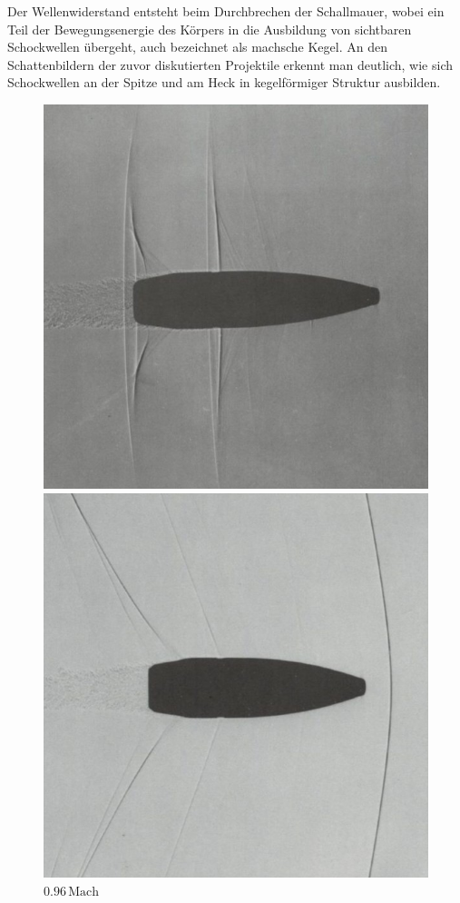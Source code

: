 Der Wellenwiderstand entsteht beim Durchbrechen 
der Schallmauer, wobei ein Teil der Bewegungsenergie 
des Körpers in die Ausbildung von sichtbaren Schockwellen übergeht,
auch bezeichnet als machsche Kegel.
An den Schattenbildern der zuvor diskutierten Projektile 
erkennt man deutlich,
wie sich Schockwellen an der Spitze und am Heck 
in kegelförmiger Struktur ausbilden.
\begin{figure}
    \centering
    \begin{minipage}[b]{0.32\textwidth}
        \centering
        \includegraphics[width=\linewidth]{papers/ueberschall/figures/0.96_mach_projektil.jpg}
        \caption*{$0.96\,\mathrm{Mach}$}
    \end{minipage}
    \hfill
    \begin{minipage}[b]{0.32\textwidth}
        \centering
        \includegraphics[width=\linewidth]{papers/ueberschall/figures/1.06_mach_projektil.jpg}

\end{minipage}
\end{figure}
